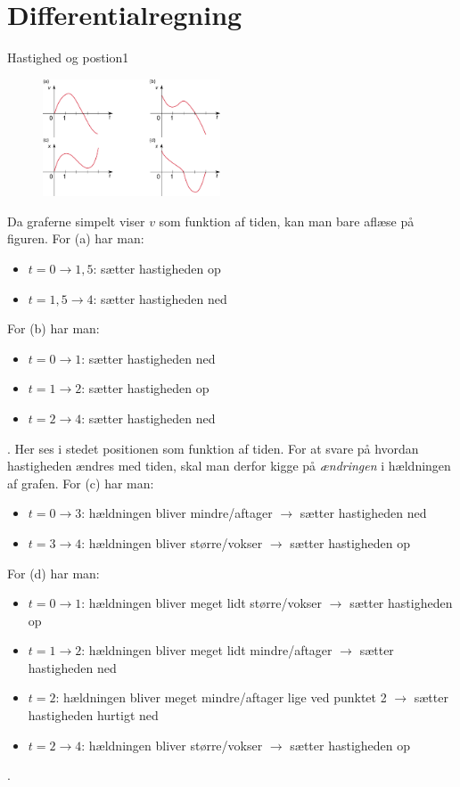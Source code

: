 \section*{Differentialregning}
\begin{opgave}{Hastighed og postion}{1}
	\begin{figure}[h!]
		\centering
		\includegraphics[width=0.47\textwidth]{matematik/vx_grafer.png}
	\end{figure}
	\opg Da graferne simpelt viser $v$ som funktion af tiden, kan man bare aflæse på figuren. For (a) har man: 
	\begin{itemize}
		\item $t= 0 \rightarrow 1,5$: sætter hastigheden op
		\item $t= 1,5 \rightarrow 4$: sætter hastigheden ned
	\end{itemize}
	For (b) har man:
	\begin{itemize}
		\item $t= 0 \rightarrow 1$: sætter hastigheden ned
		\item $t= 1 \rightarrow 2$: sætter hastigheden op
		\item $t= 2 \rightarrow 4$: sætter hastigheden ned
	\end{itemize}
	.
	\opg Her ses i stedet positionen som funktion af tiden. For at svare på hvordan hastigheden ændres med tiden, skal man derfor kigge på \emph{ændringen} i hældningen af grafen.
	For (c) har man: 
	\begin{itemize}
		\item $t= 0 \rightarrow 3$: hældningen bliver mindre/aftager $\rightarrow$ sætter hastigheden ned
		\item $t= 3 \rightarrow 4$: hældningen bliver større/vokser $\rightarrow$ sætter hastigheden op
	\end{itemize}
	For (d) har man:
	\begin{itemize}
		\item $t= 0 \rightarrow 1$: hældningen bliver meget lidt større/vokser $\rightarrow$ sætter hastigheden op
		\item $t= 1 \rightarrow 2$: hældningen bliver meget lidt mindre/aftager $\rightarrow$ sætter hastigheden ned
		\item $t= 2$: hældningen bliver meget mindre/aftager lige ved punktet 2 $\rightarrow$ sætter hastigheden hurtigt ned
		\item $t= 2 \rightarrow 4$: hældningen bliver større/vokser $\rightarrow$ sætter hastigheden op
	\end{itemize}
	.
\end{opgave}
